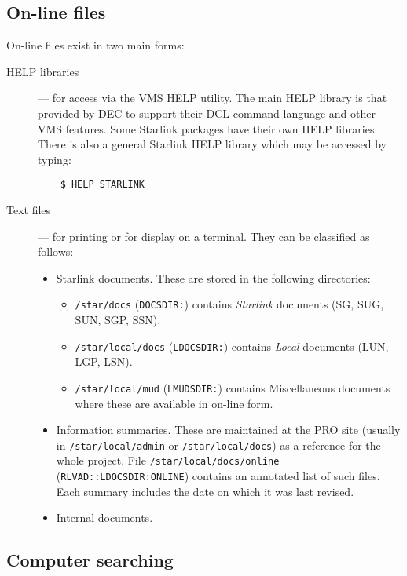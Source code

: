 \subsection{On-line files}

On-line files exist in two main forms:
\begin{description}
\item [HELP libraries] --- for access via the VMS HELP utility.
The main HELP library is that provided by DEC to support their DCL command
language and other VMS features.
Some Starlink packages have their own HELP libraries.
There is also a general Starlink HELP library which may be accessed by typing:
\begin{verbatim}
    $ HELP STARLINK
\end{verbatim}
\item [Text files] --- for printing or for display on a terminal.
They can be classified as follows:
\begin{itemize}
\item Starlink documents.
These are stored in the following directories:
\begin{itemize}
\item {\tt /star/docs} ({\tt DOCSDIR:}) contains {\em Starlink} documents
 (SG, SUG, SUN, SGP, SSN).
\item {\tt /star/local/docs} ({\tt LDOCSDIR:}) contains {\em Local} documents
 (LUN, LGP, LSN).
\item {\tt /star/local/mud} ({\tt LMUDSDIR:}) contains Miscellaneous documents
 where these are available in on-line form.
\end{itemize}
\item Information summaries.
These are maintained at the PRO site (usually in {\tt /star/\-local/\-admin} or
{\tt /star/\-local/\-docs}) as a reference for the whole project.
File {\tt /star/\-local/\-docs/\-online} ({\tt RLVAD::\-LDOCSDIR:\-ONLINE}) contains
an annotated list of such files.
Each summary includes the date on which it was last revised.
\item Internal documents.
\end{itemize}
\end{description}

\subsection{Computer searching}

